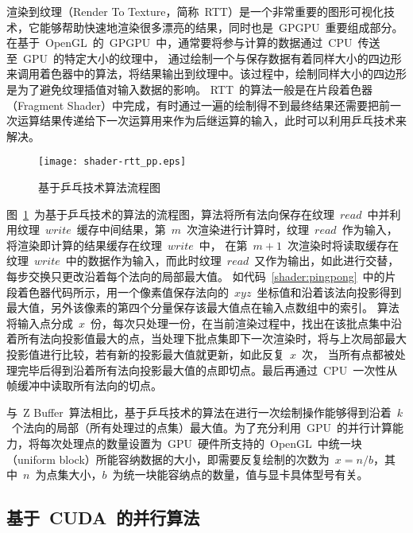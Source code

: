 渲染到纹理（Render To Texture，简称~RTT）是一个非常重要的图形可视化技术，它能够帮助快速地渲染很多漂亮的结果，同时也是~GPGPU~重要组成部分。在基于~OpenGL~的~GPGPU~中，通常要将参与计算的数据通过~CPU~传送至~GPU~的特定大小的纹理中，
通过绘制一个与保存数据有着同样大小的四边形来调用着色器中的算法\cite{gpgpuqiu}，将结果输出到纹理中。该过程中，绘制同样大小的四边形是为了避免纹理插值对输入数据的影响。
RTT~的算法一般是在片段着色器（Fragment Shader）中完成，有时通过一遍的绘制得不到最终结果还需要把前一次运算结果传递给下一次运算用来作为后继运算的输入，此时可以利用乒乓技术来解决。

\begin{figure}[htbp]
  \centering
  \texttt{[image: shader-rtt\_pp.eps]}
  \caption{基于乒乓技术算法流程图}
  \label{fig:shader-rtt-pingpong-flowchart}
\end{figure}

图~\ref{fig:shader-rtt-pingpong-flowchart}~为基于乒乓技术的算法的流程图，算法将所有法向保存在纹理~$read$~中并利用纹理~$write$~缓存中间结果，第~$m$~次渲染进行计算时，纹理~$read$~作为输入，将渲染即计算的结果缓存在纹理~$write$~中，
在第~$m+1$~次渲染时将读取缓存在纹理~$write$~中的数据作为输入，而此时纹理~$read$~又作为输出，如此进行交替，每步交换只更改沿着每个法向的局部最大值。
如代码~\ref{shader:pingpong}~中的片段着色器代码所示，用一个像素值保存法向的~$xyz$~坐标值和沿着该法向投影得到最大值，另外该像素的第四个分量保存该最大值点在输入点数组中的索引。
算法将输入点分成~$x$~份，每次只处理一份，在当前渲染过程中，找出在该批点集中沿着所有法向投影值最大的点，当处理下批点集即下一次渲染时，将与上次局部最大投影值进行比较，若有新的投影最大值就更新，如此反复~$x$~次，
当所有点都被处理完毕后得到沿着所有法向投影最大值的点即切点。最后再通过~CPU~一次性从帧缓冲中读取所有法向的切点。



与~Z Buffer~算法相比，基于乒乓技术的算法在进行一次绘制操作能够得到沿着~$k$~个法向的局部（所有处理过的点集）最大值。为了充分利用~GPU~的并行计算能力，将每次处理点的数量设置为~GPU~硬件所支持的~OpenGL~中统一块（uniform
block）所能容纳数据的大小，即需要反复绘制的次数为~$x=n/b$，其中~$n$~为点集大小，$b$~为统一块能容纳点的数量，值与显卡具体型号有关。 

\subsection{基于~CUDA~的并行算法}
\label{subsec:determ-normals-by-cuda}

